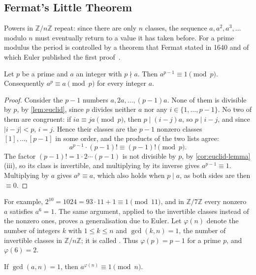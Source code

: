 \subsection{Fermat's Little Theorem}

Powers in $\mathbb Z/n\mathbb Z$ repeat: since there are only $n$ classes, the sequence $a,a^2,a^3,\ldots$ modulo $n$ must eventually return to a value it has taken before. For a prime modulus the period is controlled by a theorem that Fermat stated in 1640 and of which Euler published the first proof~\cite{hardywright2008,ribenboim1996}.

\begin{theorem}
\label{thm:fermat}
Let $p$ be a prime and $a$ an integer with $p\nmid a$. Then $a^{p-1}\equiv1\pmod p$. Consequently $a^p\equiv a\pmod p$ for every integer $a$.
\end{theorem}

\begin{proof}
Consider the $p-1$ numbers $a,2a,\ldots,(p-1)a$. None of them is divisible by $p$, by \cref{lem:euclid}, since $p$ divides neither $a$ nor any $i\in\{1,\ldots,p-1\}$. No two of them are congruent: if $ia\equiv ja\pmod p$, then $p\mid(i-j)a$, so $p\mid i-j$, and since $|i-j|<p$, $i=j$. Hence their classes are the $p-1$ nonzero classes $[1],\ldots,[p-1]$ in some order, and the products of the two lists agree:
\[
a^{p-1}\cdot(p-1)!\equiv(p-1)!\pmod p .
\]
The factor $(p-1)!=1\cdot2\cdots(p-1)$ is not divisible by $p$, by \cref{cor:euclid-lemma}\,(iii), so its class is invertible, and multiplying by its inverse gives $a^{p-1}\equiv1$. Multiplying by $a$ gives $a^p\equiv a$, which also holds when $p\mid a$, as both sides are then $\equiv0$.
\end{proof}

For example, $2^{10}=1024=93\cdot11+1\equiv1\pmod{11}$, and in $\mathbb Z/7\mathbb Z$ every nonzero $a$ satisfies $a^6=1$. The same argument, applied to the invertible classes instead of the nonzero ones, proves a generalisation due to Euler. Let $\varphi(n)$ denote the number of integers $k$ with $1\le k\le n$ and $\gcd(k,n)=1$, the number of invertible classes in $\mathbb Z/n\mathbb Z$; it is called . Thus $\varphi(p)=p-1$ for a prime $p$, and $\varphi(6)=2$.

\begin{theorem}[Euler]
\label{thm:euler-phi}
If $\gcd(a,n)=1$, then $a^{\varphi(n)}\equiv1\pmod n$.
\end{theorem}

